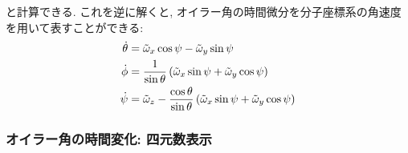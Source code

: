 と計算できる. これを逆に解くと, オイラー角の時間微分を分子座標系の角速度を用いて表すことができる:
\begin{align}
 \dot{\theta} &= \Tilde{\omega}_{x}\cos\psi - \Tilde{\omega}_{y}\sin\psi
\label{eq:RigidBodyMD7}
 \\
 \dot{\phi}   &= \frac{1}{\sin\theta}\left(\Tilde{\omega}_{x}\sin\psi + \Tilde{\omega}_{y} \cos\psi \right)
\label{eq:RigidBodyMD8}
 \\
 \dot{\psi}   &= \Tilde{\omega}_{z}- \frac{\cos\theta}{\sin\theta}\left(\Tilde{\omega}_{x}\sin\psi + \Tilde{\omega}_{y} \cos\psi \right)
 \label{eq:RigidBodyMD9}
\end{align}


\subsubsection{オイラー角の時間変化: 四元数表示}

